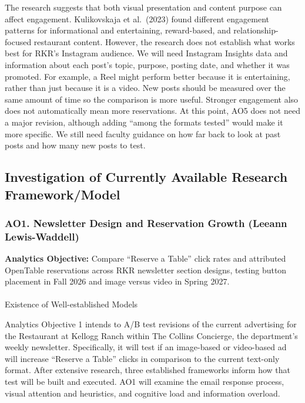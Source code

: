\documentclass[
  12pt,
  letterpaper,
  DIV=11,
  numbers=noendperiod]{scrartcl}
\makeatletter
\let\oldparagraph\paragraph
\renewcommand{\paragraph}{
    \@ifstar
      \xxxParagraphStar
      \xxxParagraphNoStar
  }
\newcommand{\xxxParagraphStar}[1]{\oldparagraph*{#1}\mbox{}}
\newcommand{\xxxParagraphNoStar}[1]{\oldparagraph{#1}\mbox{}}
\makeatother
\begin{document}
The research suggests that both visual presentation and content purpose
can affect engagement. Kulikovskaja et al.~(2023) found different
engagement patterns for informational and entertaining, reward-based,
and relationship-focused restaurant content. However, the research does
not establish what works best for RKR's Instagram audience. We will need
Instagram Insights data and information about each post's topic,
purpose, posting date, and whether it was promoted. For example, a Reel
might perform better because it is entertaining, rather than just
because it is a video. New posts should be measured over the same amount
of time so the comparison is more useful. Stronger engagement also does
not automatically mean more reservations. At this point, AO5 does not
need a major revision, although adding ``among the formats tested''
would make it more specific. We still need faculty guidance on how far
back to look at past posts and how many new posts to test.

\subsection{Investigation of Currently Available Research
Framework/Model}\label{investigation-of-currently-available-research-frameworkmodel}

\subsubsection{AO1. Newsletter Design and Reservation Growth (Leeann
Lewis-Waddell)}\label{ao1.-newsletter-design-and-reservation-growth-leeann-lewis-waddell}

\textbf{Analytics Objective:} Compare ``Reserve a Table'' click rates
and attributed OpenTable reservations across RKR newsletter section
designs, testing button placement in Fall 2026 and image versus video in
Spring 2027.

\paragraph{Existence of Well-established
Models}\label{existence-of-well-established-models}

Analytics Objective 1 intends to A/B test revisions of the current
advertising for the Restaurant at Kellogg Ranch within The Collins
Concierge, the department's weekly newsletter. Specifically, it will
test if an image-based or video-based ad will increase ``Reserve a
Table'' clicks in comparison to the current text-only format. After
extensive research, three established frameworks inform how that test
will be built and executed. AO1 will examine the email response process,
visual attention and heuristics, and cognitive load and information
overload.
\end{document}
